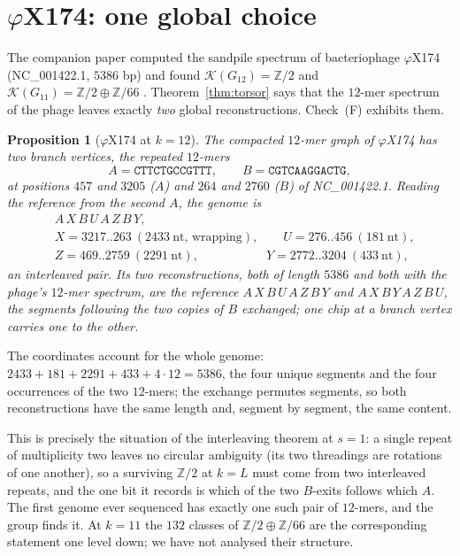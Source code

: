 \documentclass[11pt]{article}
\theoremstyle{plain}
\newtheorem{proposition}[theorem]{Proposition}
\theoremstyle{definition}
\theoremstyle{remark}
\newcommand{\Z}{\mathbb{Z}}
\newcommand{\K}{\mathcal{K}}
\begin{document}
\section{$\varphi$X174: one global choice}\label{sec:phix}

The companion paper computed the sandpile spectrum of bacteriophage $\varphi$X174
(NC\_001422.1, $5386$ bp) and found $\K(G_{12})=\Z/2$ and $\K(G_{11})=\Z/2\oplus\Z/66$
\cite[Tab.~1]{Bio1}. Theorem~\ref{thm:torsor} says that the $12$-mer spectrum of the phage
leaves exactly \emph{two} global reconstructions. Check~(F) exhibits them.

\begin{proposition}[$\varphi$X174 at $k=12$]\label{prop:phix}
The compacted $12$-mer graph of $\varphi$X174 has two branch vertices, the repeated
$12$-mers
\[
A=\texttt{CTTCTGCCGTTT},\qquad B=\texttt{CGTCAAGGACTG},
\]
at positions $457$ and $3205$ ($A$) and $264$ and $2760$ ($B$) of NC\_001422.1. Reading
the reference from the second $A$, the genome is
\begin{align*}
&A\,X\,B\,U\,A\,Z\,B\,Y,\\
&X=3217..263\ (2433\ \text{nt, wrapping}),\qquad U=276..456\ (181\ \text{nt}),\\
&Z=469..2759\ (2291\ \text{nt}),\qquad\qquad\quad\ \ Y=2772..3204\ (433\ \text{nt}),
\end{align*}
an interleaved pair. Its two reconstructions, both of length $5386$ and both with the
phage's $12$-mer spectrum, are the reference $A\,X\,B\,U\,A\,Z\,B\,Y$ and
$A\,X\,B\,Y\,A\,Z\,B\,U$, the segments following the two copies of $B$ exchanged; one chip
at a branch vertex carries one to the other.
\end{proposition}

The coordinates account for the whole genome: $2433+181+2291+433+4\cdot12=5386$, the
four unique segments and the four occurrences of the two $12$-mers; the exchange
permutes segments, so both reconstructions have the same length and, segment by segment,
the same content.

This is precisely the situation of the interleaving theorem \cite[Thm.~6]{Bio1} at $s=1$:
a single repeat of multiplicity two leaves no circular ambiguity (its two threadings are
rotations of one another), so a surviving $\Z/2$ at $k=L$ must come from two interleaved
repeats, and the one bit it records is which of the two $B$-exits follows which $A$. The
first genome ever sequenced has exactly one such pair of $12$-mers, and the group finds it.
At $k=11$ the $132$ classes of $\Z/2\oplus\Z/66$ are the corresponding statement one
level down; we have not analysed their structure.
\end{document}
